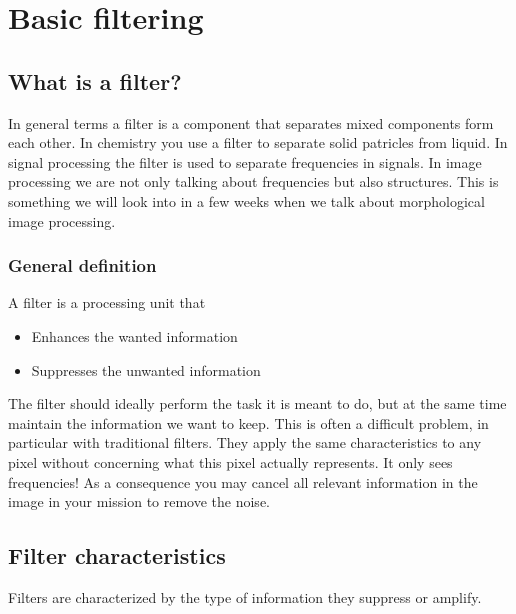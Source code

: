 \documentclass[letterpaper,10pt,english]{sphinxmanual}
\begin{document}
\chapter{Basic filtering}
\label{\detokenize{02-ImageEnhancement:basic-filtering}}

\section{What is a filter?}
\label{\detokenize{02-ImageEnhancement:what-is-a-filter}}
\sphinxAtStartPar
In general terms a filter is a component that separates mixed components form each other. In chemistry you use a filter to separate solid patricles from liquid. In signal processing the filter is used to separate frequencies in signals. In image processing we are not only talking about frequencies but also structures. This is something we will look into in a few weeks when we talk about morphological image processing.


\subsection{General definition}
\label{\detokenize{02-ImageEnhancement:general-definition}}
\sphinxAtStartPar
A filter is a processing unit that
\begin{itemize}
\item {} 
\sphinxAtStartPar
Enhances the wanted information

\item {} 
\sphinxAtStartPar
Suppresses the unwanted information

\end{itemize}



\sphinxAtStartPar
The filter should ideally perform the task it is meant to do, but at the same time maintain the information we want to keep. This is often a difficult problem, in particular with traditional filters. They apply the same characteristics to any pixel without concerning what this pixel actually represents. It only sees frequencies! As a consequence you may cancel all relevant information in the image in your mission to remove the noise.


\section{Filter characteristics}
\label{\detokenize{02-ImageEnhancement:filter-characteristics}}
\sphinxAtStartPar
Filters are characterized by the type of information they suppress or amplify.
\end{document}
